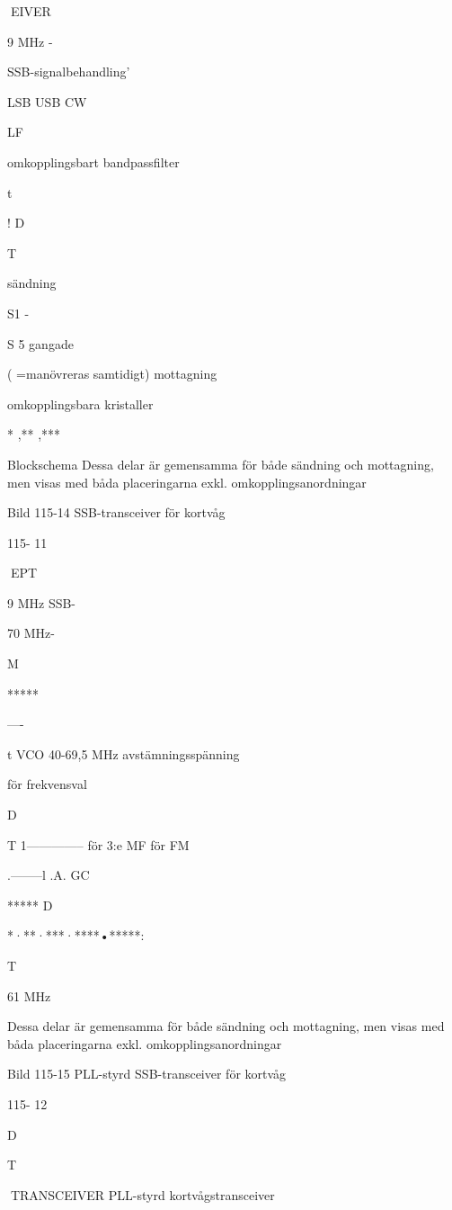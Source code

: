 EIVER

9 MHz -

SSB-signalbehandling'

LSB USB CW

LF

omkopplingsbart
bandpassfilter

t

!
D

T

sändning

S1 -

S 5 gangade

( =manövreras samtidigt)
mottagning

omkopplingsbara
kristaller

* ,** ,***

Blockschema
Dessa delar är gemensamma för både sändning och mottagning, men visas med
båda placeringarna exkl. omkopplingsanordningar

Bild 115-14 SSB-transceiver för kortvåg

115- 11

EPT

9 MHz
SSB-

70 MHz-

M

*****

----

t
VCO 40-69,5 MHz
avstämningsspänning

för frekvensval

D

T
1-------------- för 3:e MF för FM

.--------l .A. GC

*****
D

*·**·***·****•*****:

T

61 MHz

Dessa delar är gemensamma för både sändning och mottagning, men visas med
båda placeringarna exkl. omkopplingsanordningar

Bild 115-15 PLL-styrd SSB-transceiver för kortvåg

115- 12

D

T

TRANSCEIVER
PLL-styrd kortvågstransceiver

